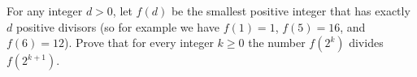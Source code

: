 For any integer $d > 0$, let $f(d)$ be the smallest positive integer that has exactly $d$ positive divisors (so for example we have $f(1) = 1$, $f(5) = 16$, and $f(6) = 12$). Prove that for every integer $k \geq 0$ the number $f(2^{k})$ divides $f(2^{k+1})$.
